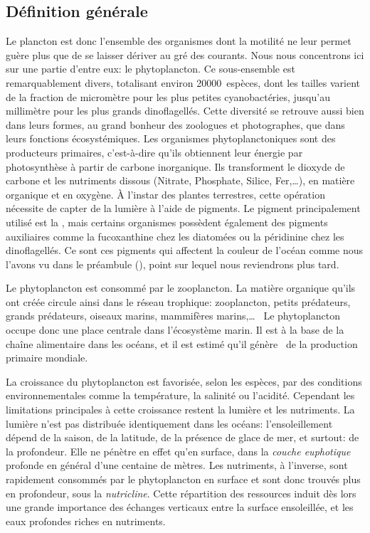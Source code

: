 \subsection{Définition générale}
\label{sec:phyto-def-gen}

Le plancton est donc l'ensemble des organismes dont la motilité ne leur permet guère plus que de se laisser dériver au gré des courants.
Nous nous concentrons ici sur une partie d'entre eux: le phytoplancton.
Ce sous-ensemble est remarquablement divers, totalisant environ \num{20 000}~espèces, dont les tailles varient de la fraction de micromètre pour les plus petites cyanobactéries, jusqu'au millimètre pour les plus grands dinoflagellés.
Cette diversité se retrouve aussi bien dans leurs formes, au grand bonheur des zoologues et photographes, que dans leurs fonctions écosystémiques.
Les organismes phytoplanctoniques sont des producteurs primaires, c'est-à-dire qu'ils obtiennent leur énergie par photosynthèse à partir de carbone inorganique.
Ils transforment le dioxyde de carbone et les nutriments dissous (Nitrate, Phosphate, Silice, Fer,\dots), en matière organique et en oxygène.
À l'instar des plantes terrestres, cette opération nécessite de capter de la lumière à l'aide de pigments.
Le pigment principalement utilisé est la , mais certains organismes possèdent également des pigments auxiliaires comme la fucoxanthine chez les diatomées ou la péridinine chez les dinoflagellés.
Ce sont ces pigments qui affectent la couleur de l'océan comme nous l'avons vu dans le préambule (), point sur lequel nous reviendrons plus tard.

Le phytoplancton est consommé par le zooplancton. La matière organique qu'ils ont créée circule ainsi dans le réseau trophique: zooplancton, petits prédateurs, grands prédateurs, oiseaux marins, mammifères marins,\dots\ %
Le phytoplancton occupe donc une place centrale dans l'écosystème marin.
Il est à la base de la chaîne alimentaire dans les océans, et il est estimé qu'il génère~ de la production primaire mondiale.

La croissance du phytoplancton est favorisée, selon les espèces, par des conditions environnementales comme la température, la salinité ou l'acidité.
Cependant les limitations principales à cette croissance restent la lumière et les nutriments.
La lumière n'est pas distribuée identiquement dans les océans: l'ensoleillement dépend de la saison, de la latitude, de la présence de glace de mer, et surtout: de la profondeur.
Elle ne pénètre en effet qu'en surface, dans la \emph{couche euphotique} profonde en général d'une centaine de mètres.
Les nutriments, à l'inverse, sont rapidement consommés par le phytoplancton en surface et sont donc trouvés plus en profondeur, sous la \emph{nutricline}.
Cette répartition des ressources induit dès lors une grande importance des échanges verticaux entre la surface ensoleillée, et les eaux profondes riches en nutriments.

